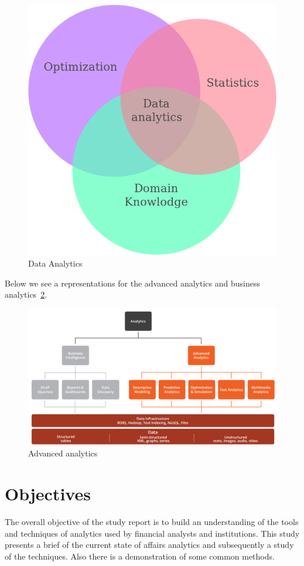 \begin{figure}[H]
	\includegraphics[scale = 0.6]{figures/AnalyticsDomain.png}
	\centering
	\caption{Data Analytics}
	\label{fig:data-analytics}
\end{figure}
\FloatBarrier

Below we see a representations for the advanced analytics and business analytics~\ref{fig:rapidminer-aa}.

\begin{figure}[H]
	\includegraphics[scale=0.4]{figures/RapidMiner_AdvancedAnalytics_new.png}
	\caption{Advanced analytics}
	\label{fig:rapidminer-aa}
\end{figure}


\section{Objectives}

The overall objective of the study report is to build an understanding of the tools and techniques of analytics used by financial analysts and institutions. This study presents a brief of the current state of affairs analytics and subsequently a study of the techniques. Also there is a demonstration of some common methods.

